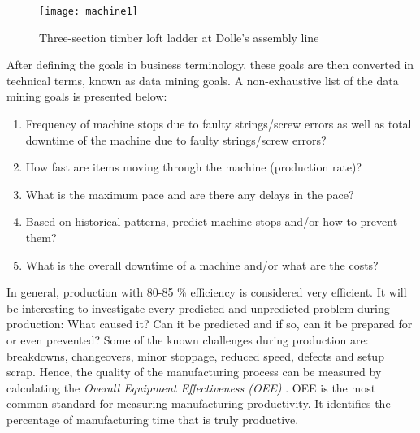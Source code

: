 \documentclass[runningheads]{llncs}
\begin{document}
\begin{figure}
\centering
\texttt{[image: machine1]}
\caption{Three-section timber loft ladder at Dolle's assembly line}
\label{fig:ladder1}
\end{figure}

After defining the goals in business terminology, these goals are then converted in technical terms, known as data mining goals. A non-exhaustive list of the data mining goals is presented below:
\begin{enumerate} 
\item Frequency of machine stops due to faulty strings/screw errors as well as total downtime of the machine due to faulty strings/screw errors?
\item How fast are items moving through the machine (production rate)?
\item What is the maximum pace and are there any delays in the pace?
\item Based on historical patterns, predict machine stops and/or how to prevent them?
\item What is the overall downtime of a machine and/or what are the costs?
\end{enumerate} 



\iffalse
In general, production with 80-85 \% efficiency is considered very efficient. It is of interest to look into every predicted and unpredicted issue/challenge during production. Why did it happen? Can it be predicted and if so can it be prevented or prepared for? How can production be optimised? Some challenges during production are known, such as, breakdowns, changeovers, minor stoppages, reduced speed, defects and setup scrap. As a result, the success of the manufacturing process can be measured by calculating the \textit{Overall Equipment Effectiveness (OEE)} \cite{oee}. OEE is the most widely used standard for measuring manufacturing productivity. 
\fi
In general, production with 80-85 \% efficiency is considered very efficient. It will be interesting to investigate every predicted and unpredicted problem during production: What caused it? Can it be predicted and if so, can it be prepared for or even prevented? Some of the known challenges during production are: breakdowns, changeovers, minor stoppage, reduced speed, defects and setup scrap. Hence, the quality of the manufacturing process can be measured by calculating the \textit{Overall Equipment Effectiveness (OEE)} \cite{oee}. OEE is the most common standard for measuring manufacturing productivity. It identifies the percentage of manufacturing time that is truly productive. 
\end{document}
